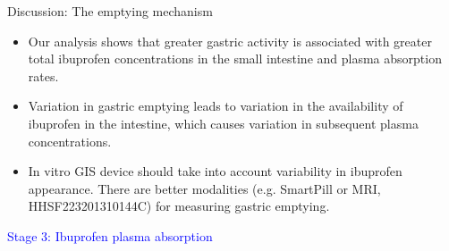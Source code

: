 \documentclass[]{beamer}
\begin{document}
\begin{frame}{Discussion: The emptying mechanism}
\small

\begin{itemize}
	\setlength\itemsep{1.25em}
	\item Our analysis shows that greater gastric activity is associated with greater total ibuprofen concentrations in the small intestine and plasma absorption rates.

	\item Variation in gastric emptying leads to variation in the availability of ibuprofen in the intestine, which causes variation in subsequent plasma concentrations.

	\item In vitro GIS device should take into account variability in ibuprofen appearance. There are better modalities (e.g. SmartPill or MRI, HHSF223201310144C) for measuring gastric emptying.
\end{itemize}


\end{frame}


\begin{frame}
\begin{center}
\LARGE \textcolor{blue}{Stage 3: Ibuprofen plasma absorption}
\end{center}
\end{frame}
\end{document}
